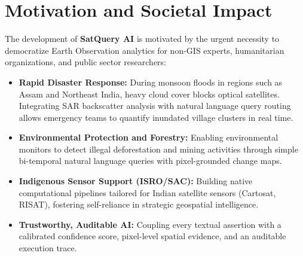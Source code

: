 \documentclass[12pt,a4paper]{report}
\begin{document}
\section{Motivation and Societal Impact}
The development of \textbf{SatQuery AI} is motivated by the urgent necessity to democratize Earth Observation analytics for non-GIS experts, humanitarian organizations, and public sector researchers:
\begin{itemize}
    \item \textbf{Rapid Disaster Response:} During monsoon floods in regions such as Assam and Northeast India, heavy cloud cover blocks optical satellites. Integrating SAR backscatter analysis with natural language query routing allows emergency teams to quantify inundated village clusters in real time.
    \item \textbf{Environmental Protection and Forestry:} Enabling environmental monitors to detect illegal deforestation and mining activities through simple bi-temporal natural language queries with pixel-grounded change maps.
    \item \textbf{Indigenous Sensor Support (ISRO/SAC):} Building native computational pipelines tailored for Indian satellite sensors (Cartosat, RISAT), fostering self-reliance in strategic geospatial intelligence.
    \item \textbf{Trustworthy, Auditable AI:} Coupling every textual assertion with a calibrated confidence score, pixel-level spatial evidence, and an auditable execution trace.
\end{itemize}
\end{document}
